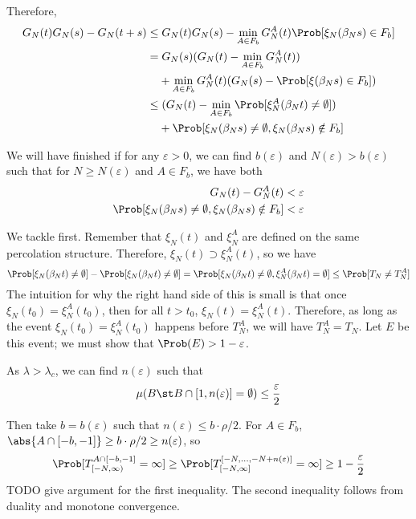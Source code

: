 \documentclass{scrartcl}
\newcommand{\ep}{\varepsilon}
\begin{document}
Therefore,
\begin{align*}
  G_{N}(t)G_{N}(s) - G_{N}(t+s) \leq& \; G_{N}(t)G_{N}(s) - \min_{A \in F_{b}} G_{N}^{A}(t) \Prob[\xi_{N}(\beta_{N}s) \in F_{b}] \\
  =& \; G_{N}(s)(G_{N}(t) - \min_{A \in F_{b}} G_{N}^{A}(t)) \\
                                 &+ \min_{A \in F_{b}} G_{N}^{A}(t)(G_{N}(s) - \Prob[\xi(\beta_{N}s) \in F_{b}]) \\
  \leq& \; (G_{N}(t) - \min_{A \in F_{b}} \Prob[\xi_{N}^{A}(\beta_{N}t) \neq \emptyset]) \\
                                 &+ \Prob[\xi_{N}(\beta_{N}s) \neq \emptyset, \xi_{N}(\beta_{N}s) \notin F_{b}]
\end{align*}

We will have finished if for any $\ep > 0$, we can find $b(\ep)$ and $N(\ep) > b(\ep)$  such that for $N \geq N(\ep)$ and $A \in F_{b}$, we have both
\begin{align}
  G_{N}(t) - G_{N}^{A}(t) &< \ep \label{eq:firstineq} \\
  \Prob[\xi_{N}(\beta_{N}s) \neq \emptyset, \xi_{N}(\beta_{N}s) \notin F_{b}] &< \ep \label{eq:secondineq}
\end{align}

We tackle  first. Remember that $\xi_{N}(t)$ and $\xi_{N}^{A}$ are defined on the same percolation structure. Therefore, $\xi_{N}(t) \supset \xi_{N}^{A}(t)$, so we have
\[ \Prob[\xi_{N}(\beta_{N} t) \neq \emptyset] - \Prob[\xi_{N}(\beta_{N} t) \neq \emptyset] = \Prob[\xi_{N}(\beta_{N} t) \neq \emptyset, \xi_{N}^{A}(\beta_{N} t) = \emptyset] \leq \Prob[T_{N} \neq T_{N}^{A}] \]
The intuition for why the right hand side of this is small is that once $\xi_{N}(t_{0}) = \xi_{N}^{A}(t_{0})$, then for all $t > t_{0}$, $\xi_{N}(t) = \xi_{N}^{A}(t)$. Therefore, as long as the event $\xi_{N}(t_{0}) = \xi_{N}^{A}(t_{0})$ happens before $T_{N}^{A}$, we will have $T_{N}^{A} = T_{N}$. Let $E$ be this event; we must show that $\Prob(E) > 1 - \ep$.

As $\lambda > \lambda_{c}$, we can find $n(\ep)$ such that
\[ \mu(B \st B \cap [1,n(\ep)] = \emptyset) \leq \frac{\ep}{2} \]

Then take $b = b(\ep)$ such that $n(\ep) \leq b \cdot \rho/2$. For $A \in F_{b}$, $\abs{A \cap [-b,-1]} \geq b \cdot \rho/2 \geq n(\ep)$, so
\[ \Prob[T_{[-N,\infty)}^{A \cap [-b,-1]} = \infty] \geq \Prob[T_{[-N,\infty]}^{[-N,\ldots,-N+n(\ep)]} = \infty] \geq 1 - \frac{\ep}{2} \]
TODO give argument for the first inequality. The second inequality follows from duality and monotone convergence.
\end{document}
